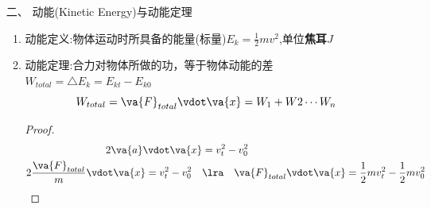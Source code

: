 \documentclass{article}
\begin{document}
\begin{itemize}
\begin{enumerate}
                  \vspace{2em}

              \item[二、] 动能(Kinetic Energy)与动能定理
                  \begin{enumerate}
                      \item 动能定义:物体运动时所具备的能量(标量)$E_{k} = \frac{1}{2}mv^{2}$,单位\textbf{焦耳$J$}
                      \item 动能定理:合力对物体所做的功，等于物体动能的差$W_{total} = \triangle E_{k} = E_{kt} - E_{k0}$
                            $$
                                W_{total} = \va{F}_{total} \vdot \va{x} = W_{1} + W{2} \cdots W_{n}
                            $$

                            \begin{proof}
                                \begin{align*}
                                    2\va{a} \vdot \va{x} &= v_{t}^{2} - v_{0}^{2}   \\
                                    2 \dfrac{\va{F}_{total}}{m} \vdot \va{x} = v_{t}^{2} - v_{0}^{2}  \quad & \lra  \quad \va{F}_{total} \vdot \va{x} = \frac{1}{2}mv_{t}^{2} -\frac{1}{2}mv_{0}^{2}
                                \end{align*}
                            \end{proof}


                  \end{enumerate}

          \end{enumerate}
\end{itemize}
\end{document}
